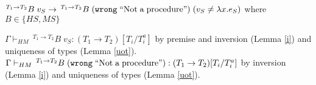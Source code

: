 \begin{case}
$^{T_{1}\rightarrow T_{2}}B\;v_{S}\rightarrow\,^{T_{1}\rightarrow T_{2}}B\;(\mathtt{wrong}\;\mathrm{``Not\;a\;procedure"})\;(v_{S}\neq\lambda x.e_{S})$ where $B\in\lbrace HS,MS\rbrace$

$\Gamma\vdash_{HM}\,^{T_{1}\rightarrow T_{2}}B\;v_{S}:(T_{1}\rightarrow T_{2})[T_{i}/T_{i}^{a}]$ by premise and inversion (Lemma \ref{i}) and uniqueness of types (Lemma \ref{uot}).  $\Gamma\vdash_{HM}\,^{T_{1}\rightarrow T_{2}}B\;(\mathtt{wrong}\;\mathrm{``Not\;a\;procedure"}):(T_{1}\rightarrow T_{2})[T_{i}/T_{i}^{a}]$ by inversion (Lemma \ref{i}) and uniqueness of types (Lemma \ref{uot}).
\end{case}